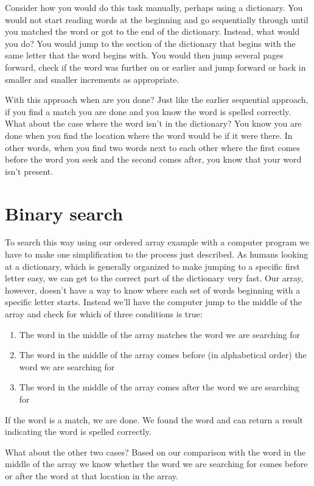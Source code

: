 Consider how you would do this task manually, perhaps using a dictionary. You would not start reading words at the beginning and go sequentially through until you matched the word or got to the end of the dictionary. Instead, what would you do? You would jump to the section of the dictionary that begins with the same letter that the word begins with. You would then jump several pages forward, check if the word was further on or earlier and jump forward or back in smaller and smaller increments as appropriate.

With this approach when are you done? Just like the earlier sequential approach, if you find a match you are done and you know the word is spelled correctly. What about the case where the word isn't in the dictionary? You know you are done when you find the location where the word would be if it were there. In other words, when you find two words next to each other where the first comes before the word you seek and the second comes after, you know that your word isn't present.

\section{Binary search}

To search this way using our ordered array example with a computer program we have to make one simplification to the process just described. As humans looking at a dictionary, which is generally organized to make jumping to a specific first letter easy, we can get to the correct part of the dictionary very fast. Our array, however, doesn't have a way to know where each set of words beginning with a specific letter starts. Instead we'll have the computer jump to the middle of the array and check for which of three conditions is true:

\begin{enumerate}
	\item The word in the middle of the array matches the word we are searching for
	\item The word in the middle of the array comes before (in alphabetical order) the word we are searching for
	\item The word in the middle of the array comes after the word we are searching for
\end{enumerate}

If the word is a match, we are done. We found the word and can return a result indicating the word is spelled correctly.

What about the other two cases? Based on our comparison with the word in the middle of the array we know whether the word we are searching for comes before or after the word at that location in the array.

